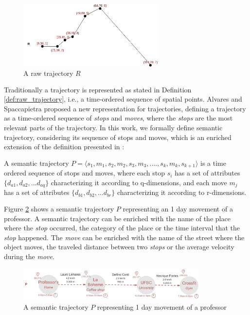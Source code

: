 \begin{figure}[h]
\centering
\includegraphics[width=0.65\textwidth]{Related_Works/Single_trajectory.jpg}
\caption{\label{fig:related_trajes}A raw trajectory $R$}
\end{figure}

Traditionally a trajectory is represented as stated in Definition \ref{def:raw_trajectory}, i.e., a time-ordered sequence of spatial points. Alvares \cite{alvares2007model} and Spaccapietra \cite{Spaccapietra:2008:CVT:1347466.1347785} proposed a new representation for trajectories, defining a trajectory as a time-ordered sequence of \emph{stops} and \emph{moves}, where the \emph{stops} are the most relevant parts of the trajectory.
In this work, we formally define semantic trajectory, considering its sequence of stops and moves, which is an enriched extension of the definition presented in \cite{Spaccapietra:2008:CVT:1347466.1347785}:

\begin{definition}
\label{def:semantic_trajectory}
A semantic trajectory  \break
$P=\langle s_1, m_1, s_2, m_2, s_3,m_3, ...., s_k, m_k, s_{k+1} \rangle$ is a time ordered sequence of stops and moves, where each stop $s_i$ has a set of attributes $\{d_{a1}, d_{a2}, ...d_{aq}\}$ characterizing it according to q-dimensions, and each move $m_j$  has a set of attributes $\{d_{b1}, d_{b2}, ...d_{br}\}$ characterizing it according to r-dimensions. 
\end{definition}

Figure \ref{fig:related_semantic_trajes} shows a semantic trajectory $P$ representing an 1 day movement of a professor. A semantic trajectory can be enriched with the name of the place where the \emph{stop} occurred, the category of the place or the time interval that the \emph{stop} happened. The \emph{move} can be enriched with the name of the street where the object moves, the traveled distance between two \emph{stops} or the average velocity during the \emph{move}.

\begin{figure}[h]
\centering
\includegraphics[width=0.85\textwidth]{Related_Works/Single_Semantic_trajectorie.jpg}
\caption{\label{fig:related_semantic_trajes}A semantic trajectory $P$ representing 1 day movement of a professor}
\end{figure}

